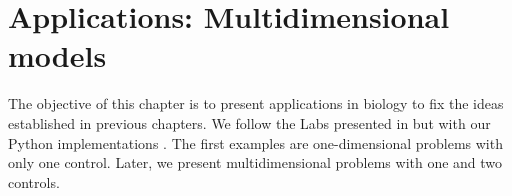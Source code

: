 \chapter{Applications: Multidimensional models } %
    The objective of this chapter is to present applications in biology to fix 
    the ideas established in previous chapters. We follow the Labs \citep{LABS} 
    presented in \citep{lenhart2007optimal} but with our Python implementations
    \citep{python_Thesisrepo}. The first examples are one-dimensional problems 
    with only one control. Later, we present multidimensional problems with one
    and two controls.  
    
    
    
    
    
    
    
    
    
    
\newpage 